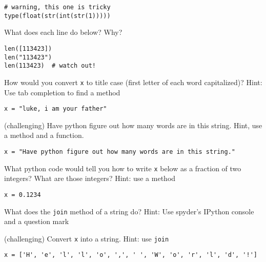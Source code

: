 \documentclass[11pt]{exam}
\begin{document}
\begin{questions}
\begin{verbatim}
# warning, this one is tricky
type(float(str(int(str(1)))))
\end{verbatim}

\item What does each line do below? Why?
\begin{verbatim}
len([113423])
len("113423")
len(113423)  # watch out!
\end{verbatim}

\item How would you convert \texttt{x} to title case (first letter of each word capitalized)? Hint: Use tab completion to find a method
\begin{verbatim}
x = "luke, i am your father"
\end{verbatim}

\item (challenging) Have python figure out how many words are in this string. Hint, use a method and a function. %
\begin{verbatim}
x = "Have python figure out how many words are in this string."
\end{verbatim}

\item What python code would tell you how to write \texttt{x} below as a fraction of two integers? What are those integers? Hint: use a method %
\begin{verbatim}
x = 0.1234
\end{verbatim}

\item What does the \texttt{join} method of a string do? Hint: Use spyder's IPython console and a question mark

\item (challenging) Convert \texttt{x} into a string. Hint: use \texttt{join} %
\begin{verbatim}
x = ['H', 'e', 'l', 'l', 'o', ',', ' ', 'W', 'o', 'r', 'l', 'd', '!']
\end{verbatim}



\end{questions}


\end{document}
